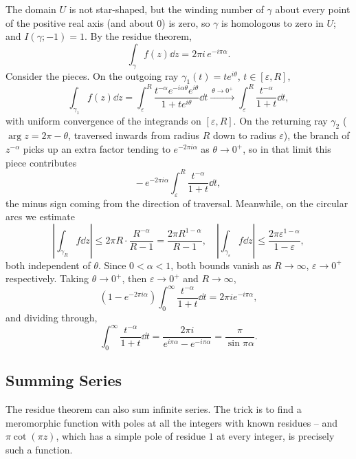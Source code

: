 \begin{example}
    The domain $U$ is not star-shaped, but the winding number of $\gamma$ about every point of the positive real axis (and about $0$) is zero, so $\gamma$ is homologous to zero in $U$; and $I(\gamma; -1) = 1$. By the residue theorem,
    $$
    \int_\gamma f(z) \dd z = 2 \pi i \, e^{-i \pi \alpha}.
    $$
    Consider the pieces. On the outgoing ray $\gamma_1(t) = te^{i\theta}$, $t \in [\varepsilon, R]$,
    $$
    \int_{\gamma_1} f(z) \dd z = \int_\varepsilon^R \frac{t^{-\alpha}e^{-i \alpha \theta}e^{i \theta}}{1 + te^{i\theta}} \dd t \xrightarrow{\ \theta \to 0^+\ } \int_\varepsilon^R \frac{t^{-\alpha}}{1 + t} \dd t,
    $$
    with uniform convergence of the integrands on $[\varepsilon, R]$. On the returning ray $\gamma_2$ ($\arg z = 2\pi - \theta$, traversed inwards from radius $R$ down to radius $\varepsilon$), the branch of $z^{-\alpha}$ picks up an extra factor tending to $e^{-2 \pi i \alpha}$ as $\theta \rightarrow 0^+$, so in that limit this piece contributes
    $$
    -\, e^{-2 \pi i \alpha}\int_\varepsilon^R \frac{t^{-\alpha}}{1 + t} \dd t,
    $$
    the minus sign coming from the direction of traversal. Meanwhile, on the circular arcs we estimate
    $$
    \left|\int_{\gamma_R} f \dd z\right| \leq 2 \pi R \cdot \frac{R^{-\alpha}}{R - 1} = \frac{2 \pi R^{1 - \alpha}}{R - 1},
    \quad
    \left|\int_{\gamma_\varepsilon} f \dd z\right| \leq \frac{2 \pi \varepsilon^{1 - \alpha}}{1 - \varepsilon},
    $$
    both independent of $\theta$. Since $0 < \alpha < 1$, both bounds vanish as $R \rightarrow \infty$, $\varepsilon \rightarrow 0^+$ respectively. Taking $\theta \rightarrow 0^+$, then $\varepsilon \rightarrow 0^+$ and $R \rightarrow \infty$,
    $$
    \left(1 - e^{-2 \pi i \alpha}\right)\int_0^{\infty} \frac{t^{-\alpha}}{1 + t} \dd t = 2 \pi i e^{-i \pi \alpha},
    $$
    and dividing through,
    $$
    \int_0^{\infty} \frac{t^{-\alpha}}{1 + t} \dd t = \frac{2 \pi i}{e^{i \pi \alpha} - e^{-i \pi \alpha}} = \frac{\pi}{\sin \pi \alpha}.
    $$
\end{example}

\subsection{Summing Series}

The residue theorem can also sum infinite series. The trick is to find a meromorphic function with poles at all the integers with known residues -- and $\pi\cot(\pi z)$, which has a simple pole of residue $1$ at every integer, is precisely such a function.

